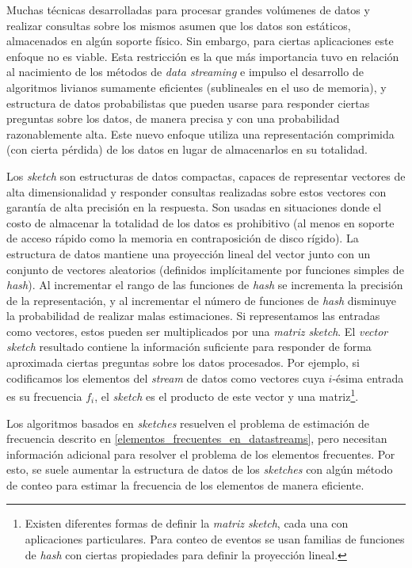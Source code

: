 \documentclass[a4paper,10pt, oneside]{article}
\begin{document}
Muchas técnicas desarrolladas para procesar grandes volúmenes de datos y realizar consultas sobre los mismos asumen que los datos son estáticos, almacenados en algún soporte físico. Sin embargo, para ciertas aplicaciones este enfoque no es viable. Esta restricción es la que más importancia tuvo en relación al nacimiento de los métodos de \textit{data streaming} e impulso el desarrollo de algoritmos livianos sumamente eficientes (sublineales en el uso de memoria), y estructura de datos probabilistas que pueden usarse para responder ciertas preguntas sobre los datos, de manera precisa y con una probabilidad razonablemente alta. Este nuevo enfoque utiliza una representación comprimida (con cierta pérdida) de los datos en lugar de almacenarlos en su totalidad.

Los \textit{sketch} son estructuras de datos compactas, capaces de representar vectores de alta dimensionalidad y responder consultas realizadas sobre estos vectores con garantía de alta precisión en la respuesta\cite{Cormode:2005:IDS:1073713.1073718}. Son usadas en situaciones donde el costo de almacenar la totalidad de los datos es prohibitivo (al menos en soporte de acceso rápido como la memoria en contraposición de disco rígido). La estructura de datos mantiene una proyección lineal del vector junto con un conjunto de vectores aleatorios (definidos implícitamente por funciones simples de \textit{hash}). Al incrementar el rango de las funciones de \textit{hash} se incrementa la precisión de la representación, y al incrementar el número de funciones de \textit{hash} disminuye la probabilidad de realizar malas estimaciones.
Si representamos las entradas como vectores, estos pueden ser multiplicados por una \textit{matriz sketch}. El \textit{vector sketch} resultado contiene la  información suficiente para responder de forma aproximada ciertas preguntas sobre los datos procesados. Por ejemplo, si codificamos los elementos del \textit{stream} de datos como vectores cuya $i$-ésima entrada es su frecuencia $f_i$, el \textit{sketch} es el producto de este vector y una matriz\footnote{Existen diferentes formas de definir la \textit{matriz sketch}, cada una con aplicaciones particulares. Para conteo de eventos se usan familias de funciones de \textit{hash} con ciertas propiedades para definir la proyección lineal.}.

Los algoritmos basados en \textit{sketches} resuelven el problema de estimación de frecuencia descrito en \ref{elementos_frecuentes_en_datastreams}, pero necesitan información adicional para resolver el problema de los elementos frecuentes. Por esto, se suele aumentar la estructura de datos de los \textit{sketches} con algún método de conteo para estimar la frecuencia de los elementos de manera eficiente.
\end{document}
